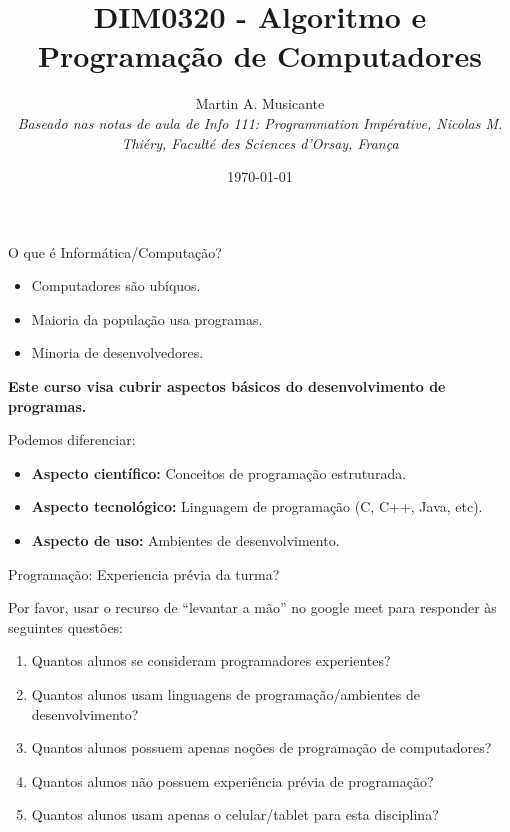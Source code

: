 \documentclass[handout,t]{beamer}
\title[DIM0320]{DIM0320 - Algoritmo e Programação de Computadores}
\date{\today}
\author[M.Musicante]{
	Martin A. Musicante\\%
	\vspace{0.25cm}
	\textsl{\small Baseado nas notas de aula de Info 111: Programmation Impérative, Nicolas M. Thiéry, Faculté des Sciences d’Orsay, França}}
\institute[INSTITUTO]{
	\url{mam@dimap.ufrn.br}\\
	\vspace{0.25cm}
	Departamento de Informática e Matemática Aplicada}
\begin{document}
\frame{\titlepage}



\begin{frame}{O que é Informática/Computação?}
\begin{itemize}
    \item Computadores são ubíquos.
    \item Maioria da população usa programas.
    \item Minoria de desenvolvedores.
\end{itemize}

\vfill
\begin{center}
\textbf{Este curso visa cubrir aspectos  básicos do desenvolvimento de programas.}
    \end{center}
\vfill

Podemos diferenciar:
\begin{itemize}
    \item \textbf{Aspecto científico:} Conceitos de programação estruturada.
    \item \textbf{Aspecto tecnológico:} Linguagem de programação (C, C++, Java, etc).
    \item \textbf{Aspecto de uso:} Ambientes de desenvolvimento.
\end{itemize}

\end{frame}

\begin{frame}{Programação: Experiencia prévia da turma?}

Por favor, usar o recurso de ``levantar a mão'' no google meet para responder às seguintes questões:
\vfill
\begin{enumerate}
    \item Quantos alunos se consideram programadores experientes?
    \item Quantos alunos usam linguagens de programação/ambientes de desenvolvimento?
    \item Quantos alunos possuem apenas noções de programação de computadores?
    \item Quantos alunos não possuem experiência prévia de programação?
    \item Quantos alunos usam apenas o celular/tablet para esta disciplina?

\end{enumerate}
\vfill
\end{frame}
\end{document}
